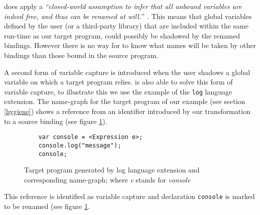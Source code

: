 \textit{\vfix} does apply a \textit{``closed-world assumption to infer that all unbound variables are indeed free, and thus can be renamed at will.''}~\cite{Erdweg2014}. This means that global variables defined by the user (or a third-party library) that are included within the same run-time as our target program, could possibly be shadowed by the renamed bindings. However there is no way for \textit{\vfix} to know what names will be taken by other bindings than those bound in the source program.

A second form of variable capture is introduced when the user shadows a global variable on which a target program relies. \textit{\vfix} is also able to solve this form of variable capture, to illustrate this we use the example of the \lstinline$log$ language extension. The name-graph for the target program of our example (see section \ref{hygiene}) shows a reference from an identifier introduced by our transformation to a source binding (see figure \ref{fig:vfix2}).

\begin{figure}[h]
\centering
\begin{minipage}{0.65\linewidth}
\begin{lstlisting}
	var console = <Expression e>;
	console.log("message");
	console;
\end{lstlisting}
\end{minipage}
\hfill
\begin{minipage}{0.25\linewidth}
\end{minipage}
\caption{Target program generated by log language extension and corresponding name-graph; where \textit{c} stands for \textit{console}} \label{fig:vfix2}
\end{figure}

This reference is identified as variable capture and declaration \lstinline$console$ is marked to be renamed (see figure \ref{fig:vfix2}. 

